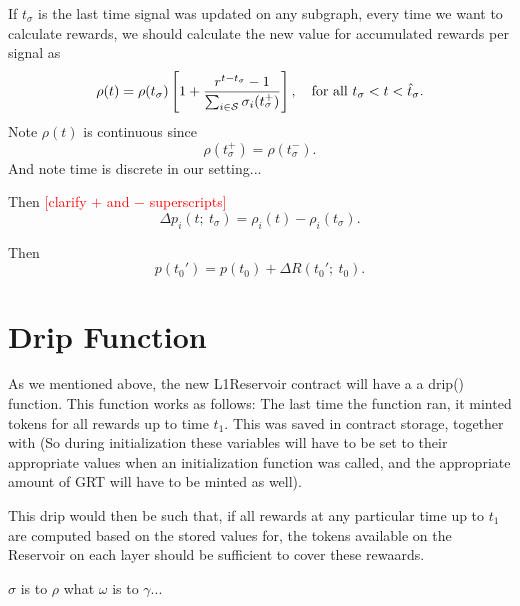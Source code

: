 {If $t_\sigma$ is the last time signal was updated on any subgraph, every time we want to calculate rewards, we should calculate the new value for accumulated rewards per signal as
\begin{equation}
    \rho(t)
    = \rho(t_\sigma) \left[1 + \dfrac{r^{t-t_\sigma} - 1}{\sum_{i\in\mathcal{S}} \sigma_i(t_\sigma^+)} \right],
    \ \ \ \mbox{for all $ t_\sigma < t < \hat{t}_{\sigma}$.}
\end{equation}
Note $\rho(t)$ is continuous since
\begin{equation}
    \rho(t_\sigma^+) = \rho(t_\sigma^-).
\end{equation}
And note time is discrete in our setting...


Then \textcolor{red}{[clarify $+$ and $-$ superscripts]}
\begin{equation}
    \Delta p_i(t;\ t_\sigma)
    = \rho_i(t) - \rho_i(t_\sigma).
\end{equation}

Then 
\begin{equation}
    p(t_0') = p(t_0) + \Delta R(t_0';\  t_0).
\end{equation}

\section*{Drip Function}
As we mentioned above, the new L1Reservoir contract will have a a drip() function. This function works as follows:
The last time the function ran, it minted tokens for all rewards up to time  $t_1$. This was saved in contract storage, together with  (So during initialization these variables will have to be set to their appropriate values when an initialization function was called, and the appropriate amount of GRT will have to be minted as well).

This drip would then be such that, if all rewards at any particular time up to $t_1$ are computed based on the stored values for, the tokens available on the Reservoir on each layer should be sufficient to cover these rewaards.


$\sigma$ is to $\rho$ what $\omega$ is to $\gamma$...

}
